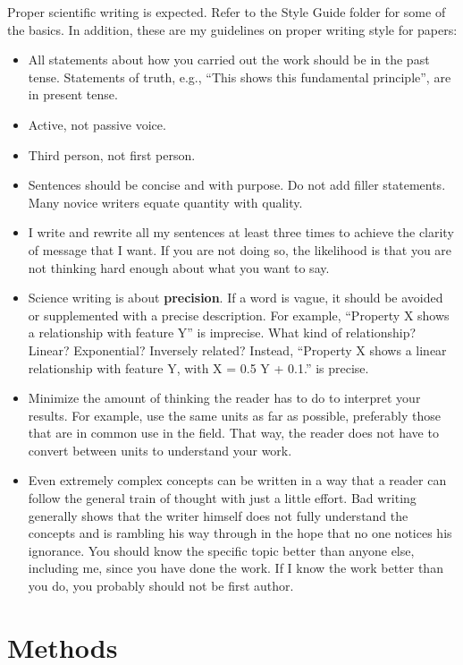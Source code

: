 \documentclass[manuscript=article]{achemso}
\begin{document}
Proper scientific writing is expected. Refer to the Style Guide folder for some of the basics. In addition, these are my guidelines on proper writing style for papers:
\begin{itemize}
\item All statements about how you carried out the work should be in the past tense. Statements of truth, e.g., ``This shows this fundamental principle'', are in present tense. 
\item Active, not passive voice.
\item Third person, not first person.
\item Sentences should be concise and with purpose. Do not add filler statements. Many novice writers equate quantity with quality. 
\item I write and rewrite all my sentences at least three times to achieve the clarity of message that I want. If you are not doing so, the likelihood is that you are not thinking hard enough about what you want to say.
\item Science writing is about \textbf{precision}. If a word is vague, it should be avoided or supplemented with a precise description. For example, ``Property X shows a relationship with feature Y'' is imprecise. What kind of relationship? Linear? Exponential? Inversely related? Instead, ``Property X shows a linear relationship with feature Y, with X = 0.5 Y + 0.1.'' is precise.
\item Minimize the amount of thinking the reader has to do to interpret your results. For example, use the same units as far as possible, preferably those that are in common use in the field. That way, the reader does not have to convert between units to understand your work.
\item Even extremely complex concepts can be written in a way that a reader can follow the general train of thought with just a little effort. Bad writing generally shows that the writer himself does not fully understand the concepts and is rambling his way through in the hope that no one notices his ignorance. You should know the specific topic better than anyone else, including me, since you have done the work. If I know the work better than you do, you probably should not be first author.
\end{itemize}

\section{Methods}
\end{document}
